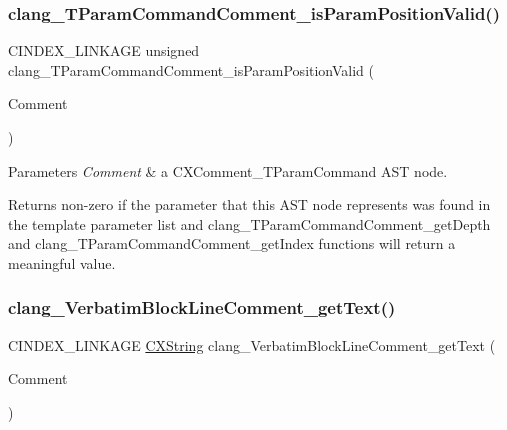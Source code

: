 \subsubsection{\texorpdfstring{clang\+\_\+\+T\+Param\+Command\+Comment\+\_\+is\+Param\+Position\+Valid()}{clang\_TParamCommandComment\_isParamPositionValid()}}
{\footnotesize\ttfamily C\+I\+N\+D\+E\+X\+\_\+\+L\+I\+N\+K\+A\+GE unsigned clang\+\_\+\+T\+Param\+Command\+Comment\+\_\+is\+Param\+Position\+Valid (\begin{DoxyParamCaption}\item[{\hyperlink{structCXComment}{C\+X\+Comment}}]{Comment }\end{DoxyParamCaption})}


\begin{DoxyParams}{Parameters}
{\em Comment} & a {\ttfamily C\+X\+Comment\+\_\+\+T\+Param\+Command} A\+ST node.\\
\hline
\end{DoxyParams}
\begin{DoxyReturn}{Returns}
non-\/zero if the parameter that this A\+ST node represents was found in the template parameter list and {\ttfamily clang\+\_\+\+T\+Param\+Command\+Comment\+\_\+get\+Depth} and {\ttfamily clang\+\_\+\+T\+Param\+Command\+Comment\+\_\+get\+Index} functions will return a meaningful value. 
\end{DoxyReturn}
\mbox{\label{group__CINDEX__COMMENT_ga599fad38a1c52917a2458ac10412969f}} 
\subsubsection{\texorpdfstring{clang\+\_\+\+Verbatim\+Block\+Line\+Comment\+\_\+get\+Text()}{clang\_VerbatimBlockLineComment\_getText()}}
{\footnotesize\ttfamily C\+I\+N\+D\+E\+X\+\_\+\+L\+I\+N\+K\+A\+GE \hyperlink{structCXString}{C\+X\+String} clang\+\_\+\+Verbatim\+Block\+Line\+Comment\+\_\+get\+Text (\begin{DoxyParamCaption}\item[{\hyperlink{structCXComment}{C\+X\+Comment}}]{Comment }\end{DoxyParamCaption})}


